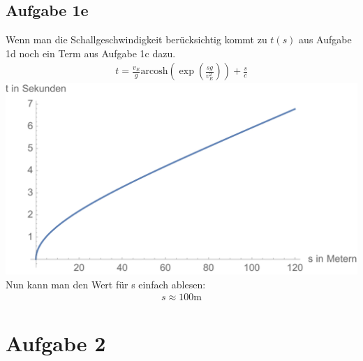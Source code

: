 \documentclass[a4paper,10pt]{extarticle}
\begin{document}
\subsection*{Aufgabe 1e}
Wenn man die Schallgeschwindigkeit berücksichtig kommt zu $t(s)$ aus Aufgabe 1d noch ein Term aus Aufgabe 1c dazu.
\begin{align*}
  t = \frac{v_E}{g}\mbox{arcosh}(\exp(\frac{sg}{v_E^2})) + \frac{s}{c}
\end{align*}
\includegraphics[scale=0.5]{./Abbildungen/Abbildung_06.pdf}
Nun kann man den Wert für s einfach ablesen:
\begin{align*}
  s \approx 100\mbox{m}
\end{align*}


\section*{Aufgabe 2}
\end{document}

